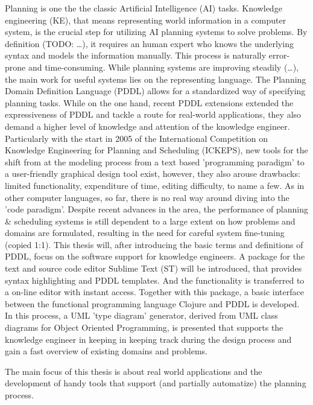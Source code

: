 \documentclass[11pt]{article}
\begin{document}
Planning is one the the classic Artificial Intelligence (AI) tasks.
Knowledge engineering (KE), that means representing world information
in a computer system, is the crucial step for utilizing AI planning
systems to solve problems. By definition (TODO: \ldots{}), it requires an
human expert who knows the underlying syntax and models the
information manually. This process is naturally error-prone and
time-consuming. While planning systems are improving steadily (\ldots{}),
the main work for useful systems lies on the representing language.
The Planning Domain Definition Language (PDDL)
\parencite{mcdermott1998pddl} allows for a standardized way of
specifying planning tasks. While on the one hand, recent PDDL
extensions \parencite{fox2003pddl2,kovacs2011bnf} extended the
expressiveness of PDDL and tackle a route for real-world applications,
they also demand a higher level of knowledge and attention of the
knowledge engineer. Particularly with the start in 2005 of the
International Competition on Knowledge Engineering for Planning and
Scheduling (ICKEPS), new tools for the shift from at the modeling
process from a text based 'programming paradigm' to a user-friendly
graphical design tool exist, however, they also arouse drawbacks:
limited functionality, expenditure of time, editing difficulty, to
name a few. As in other computer languages, so far, there is no real
way around diving into the 'code paradigm'. Despite recent advances in
the area, the performance of planning \& scheduling systems is still
dependent to a large extent on how problems and domains are
formulated, resulting in the need for careful system fine-tuning
(copied 1:1). This thesis will, after introducing the basic terms and
definitions of PDDL, focus on the software support for knowledge
engineers. A package for the text and source code editor Sublime Text
(ST) will be introduced, that provides syntax highlighting and PDDL
templates. And the functionality is transferred to a on-line editor
with instant access. Together with this package, a basic interface
between the functional programming language Clojure and PDDL is
developed. In this process, a UML 'type diagram' generator, derived
from UML class diagrams for Object Oriented Programming, is presented
that supports the knowledge engineer in keeping in keeping track
during the design process and gain a fast overview of existing domains
and problems.

The main focus of this thesis is about real world applications and the
development of handy tools that support (and partially automatize) the
planning process. 
\end{document}
